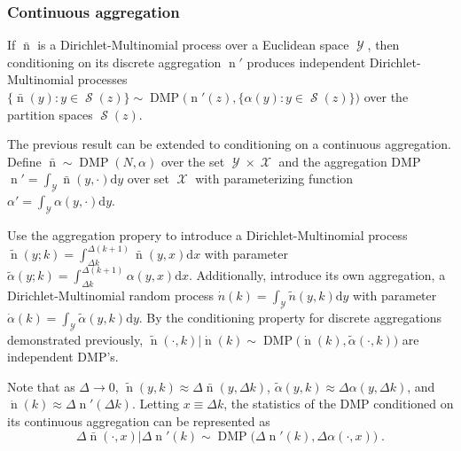 \documentclass[12pt]{report}
\DeclareMathOperator{\nrm}{\mathrm{n}}
\DeclareMathOperator{\Xcal}{\mathcal{X}}
\DeclareMathOperator{\Ycal}{\mathcal{Y}}
\DeclareMathOperator{\Scal}{\mathcal{S}}
\DeclareMathOperator{\DMP}{\mathrm{DMP}}
\begin{document}
\subsection{Continuous aggregation}

If $\bar{\nrm}$ is a Dirichlet-Multinomial process over a Euclidean space $\Ycal$, then conditioning on its discrete aggregation $\nrm'$ produces independent Dirichlet-Multinomial processes $\big\{ \bar{\nrm}(y) : y \in \Scal(z) \big\} \sim \DMP\Big( \nrm'(z),\big\{ \alpha(y) : y \in \Scal(z) \big\} \Big)$ over the partition spaces $\Scal(z)$.

The previous result can be extended to conditioning on a continuous aggregation. Define $\bar{\nrm} \sim \DMP(N,\alpha)$ over the set $\Ycal \times \Xcal$ and the aggregation DMP $\nrm' = \int_{\Ycal} \bar{\nrm}(y,\cdot) \mathrm{d}y$ over set $\Xcal$ with parameterizing function $\alpha' = \int_{\Ycal} \alpha(y,\cdot) \mathrm{d}y$.

Use the aggregation propery to introduce a Dirichlet-Multinomial process $\tilde{\nrm}(y;k) = \int_{\Delta k}^{\Delta (k+1)} \bar{\nrm}(y,x) \mathrm{d}x$ with parameter $\tilde{\alpha}(y;k) = \int_{\Delta k}^{\Delta (k+1)} \alpha(y,x) \mathrm{d}x$. Additionally, introduce its own aggregation, a Dirichlet-Multinomial random process $\dot{n}(k) = \int_{\Ycal} \tilde{n}(y,k) \mathrm{d}y$ with parameter $\dot{\alpha}(k) = \int_{\Ycal} \tilde{\alpha}(y,k) \mathrm{d}y$. By the conditioning property for discrete aggregations demonstrated previously, $\tilde{\nrm}(\cdot,k) | \dot{\nrm}(k) \sim \DMP\big( \dot{\nrm}(k),\tilde{\alpha}(\cdot,k) \big)$ are independent DMP's.

Note that as $\Delta \to 0$, $\tilde{\nrm}(y,k) \approx \Delta \bar{\nrm}(y,\Delta k)$, $\tilde{\alpha}(y,k) \approx \Delta \alpha(y,\Delta k)$, and $\dot{\nrm}(k) \approx \Delta \nrm'(\Delta k)$. Letting $x \equiv \Delta k$, the statistics of the DMP conditioned on its continuous aggregation can be represented as
\begin{equation}
\Delta \bar{\nrm}(\cdot,x) | \Delta \nrm'(k) \sim \DMP\big( \Delta \nrm'(k), \Delta \alpha(\cdot,x) \big) \;.
\end{equation}







\chapter{}
\end{document}
